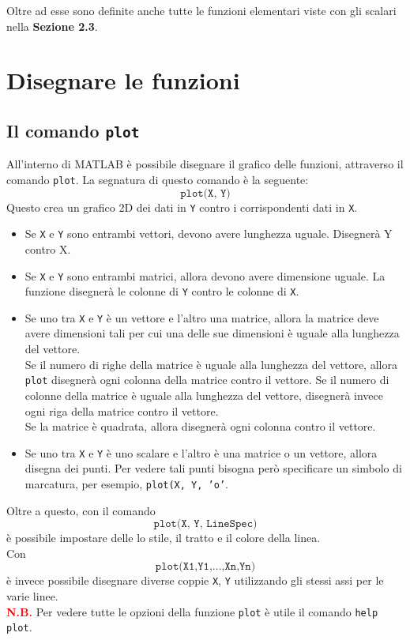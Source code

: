 \documentclass[12pt,a4paper,oneside]{book}
\begin{document}
Oltre ad esse sono definite anche tutte le funzioni elementari viste con gli scalari nella \textbf{Sezione 2.3}.


\newpage

\chapter{Disegnare le funzioni}
\section{Il comando \texttt{plot}}
All'interno di MATLAB è possibile disegnare il grafico delle funzioni, attraverso il comando \texttt{plot}.
La segnatura di questo comando è la seguente:
$$ \texttt{plot(X, Y)} $$
Questo crea un grafico 2D dei dati in \texttt{Y} contro i corrispondenti dati in \texttt{X}.
\begin{itemize}
	\item 	Se \texttt{X} e \texttt{Y} sono entrambi vettori, devono avere lunghezza uguale. Disegnerà Y contro X.
	\item	Se \texttt{X} e \texttt{Y} sono entrambi matrici, allora devono avere dimensione uguale. La funzione
			disegnerà le colonne di \texttt{Y} contro le colonne di \texttt{X}.
	\item	Se uno tra \texttt{X} e \texttt{Y} è un vettore e l'altro una matrice, allora la matrice deve avere
			dimensioni tali per cui una delle sue dimensioni è uguale alla lunghezza del vettore. \\
			Se il numero di righe della matrice è uguale alla lunghezza del vettore, allora \texttt{plot} 
			disegnerà ogni colonna della matrice contro il vettore. Se il numero di colonne della matrice è uguale
			alla lunghezza del vettore, disegnerà invece ogni riga della matrice contro il vettore. \\
			Se la matrice è quadrata, allora disegnerà ogni colonna contro il vettore.
	\item	Se uno tra \texttt{X} e \texttt{Y} è uno scalare e l'altro è una matrice o un vettore, allora disegna
			dei punti. Per vedere tali punti bisogna però specificare un simbolo di marcatura, per esempio,
			\texttt{plot(X, Y, 'o'}.
\end{itemize}

Oltre a questo, con il comando $$\texttt{plot(X, Y, LineSpec)}$$ è possibile impostare delle lo stile, il tratto e il colore della linea. \break \\
Con $$\texttt{plot(X1,Y1,...,Xn,Yn)}$$ è invece possibile disegnare diverse coppie \texttt{X}, \texttt{Y} utilizzando gli stessi assi per le varie linee. \break \\

\textcolor{Red}{\textbf{N.B.}} Per vedere tutte le opzioni della funzione \texttt{plot} è utile il comando \texttt{help plot}.
\end{document}
